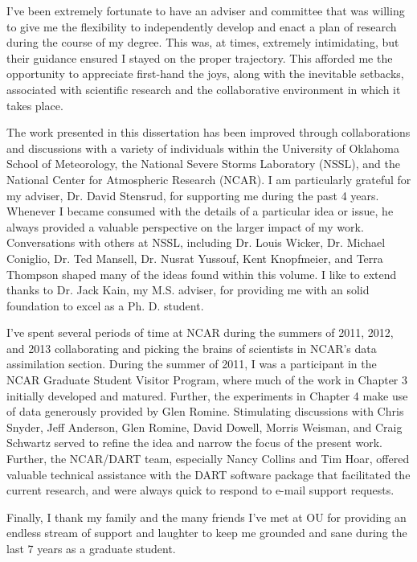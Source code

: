 \begin{preface}
I've been extremely fortunate to have an adviser and committee that was willing to give me the flexibility to independently develop and enact a plan of research during the course of my degree. This was, at times, extremely intimidating, but their guidance ensured I stayed on the proper trajectory. This afforded me the opportunity to appreciate first-hand the joys, along with the inevitable setbacks, associated with scientific research and the collaborative environment in which it takes place.

The work presented in this dissertation has been improved through  collaborations and discussions with a variety of individuals within the University of Oklahoma School of Meteorology, the National Severe Storms Laboratory (NSSL), and the National Center for Atmospheric Research (NCAR). I am particularly grateful for my adviser, Dr. David Stensrud, for supporting me during the past 4 years. Whenever I became consumed with the details of a particular idea or issue, he always provided a valuable perspective on the larger impact of my work. Conversations with others at NSSL, including Dr. Louis Wicker, Dr. Michael Coniglio, Dr. Ted Mansell, Dr. Nusrat Yussouf, Kent Knopfmeier, and Terra Thompson shaped many of the ideas found within this volume. I like to extend thanks to Dr. Jack Kain, my M.S. adviser, for providing me with an solid foundation to excel as a Ph. D. student.

I've spent several periods of time at NCAR during the summers of 2011, 2012, and 2013 collaborating and picking the brains of scientists in NCAR's data assimilation section. During the summer of 2011, I was a participant in the NCAR Graduate Student Visitor Program, where much of the work in Chapter 3 initially developed and matured. Further, the experiments in Chapter 4 make use of data generously provided by Glen Romine. Stimulating discussions with Chris Snyder, Jeff Anderson, Glen Romine, David Dowell, Morris Weisman, and Craig Schwartz served to refine the idea and narrow the focus of the present work. Further, the NCAR/DART team, especially Nancy Collins and Tim Hoar, offered valuable technical assistance with the DART software package that facilitated the current research, and were always quick to respond to e-mail support requests.

Finally, I thank my family and the many friends I've met at OU for providing an endless stream of support and laughter to keep me grounded and sane during the last 7 years as a graduate student.


\end{preface}

